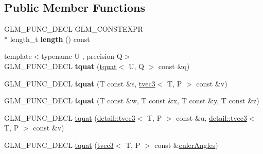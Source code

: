 \subsection*{Public Member Functions}
\begin{DoxyCompactItemize}
\item 
\hypertarget{structglm_1_1detail_1_1tquat_a430be0cf6fd0006c904b9ecdb03bd711}{G\-L\-M\-\_\-\-F\-U\-N\-C\-\_\-\-D\-E\-C\-L G\-L\-M\-\_\-\-C\-O\-N\-S\-T\-E\-X\-P\-R \\*
length\-\_\-t {\bfseries length} () const }\label{structglm_1_1detail_1_1tquat_a430be0cf6fd0006c904b9ecdb03bd711}

\item 
\hypertarget{structglm_1_1detail_1_1tquat_aa6b415284ed415db4ac328f3c0fd42d7}{{\footnotesize template$<$typename U , precision Q$>$ }\\G\-L\-M\-\_\-\-F\-U\-N\-C\-\_\-\-D\-E\-C\-L {\bfseries tquat} (\hyperlink{structglm_1_1detail_1_1tquat}{tquat}$<$ U, Q $>$ const \&q)}\label{structglm_1_1detail_1_1tquat_aa6b415284ed415db4ac328f3c0fd42d7}

\item 
\hypertarget{structglm_1_1detail_1_1tquat_aba298cc62aaee76c3d19294f33454187}{G\-L\-M\-\_\-\-F\-U\-N\-C\-\_\-\-D\-E\-C\-L {\bfseries tquat} (T const \&s, \hyperlink{structglm_1_1detail_1_1tvec3}{tvec3}$<$ T, P $>$ const \&v)}\label{structglm_1_1detail_1_1tquat_aba298cc62aaee76c3d19294f33454187}

\item 
\hypertarget{structglm_1_1detail_1_1tquat_af383bd6a9c92f94bc8b7ba0be770d4e5}{G\-L\-M\-\_\-\-F\-U\-N\-C\-\_\-\-D\-E\-C\-L {\bfseries tquat} (T const \&w, T const \&x, T const \&y, T const \&z)}\label{structglm_1_1detail_1_1tquat_af383bd6a9c92f94bc8b7ba0be770d4e5}

\item 
G\-L\-M\-\_\-\-F\-U\-N\-C\-\_\-\-D\-E\-C\-L \hyperlink{structglm_1_1detail_1_1tquat_a203189580d111eb8a73ed10a1d640464}{tquat} (\hyperlink{structglm_1_1detail_1_1tvec3}{detail\-::tvec3}$<$ T, P $>$ const \&u, \hyperlink{structglm_1_1detail_1_1tvec3}{detail\-::tvec3}$<$ T, P $>$ const \&v)
\item 
\hypertarget{structglm_1_1detail_1_1tquat_acfc1714febec517f5313a91c3ae2e687}{G\-L\-M\-\_\-\-F\-U\-N\-C\-\_\-\-D\-E\-C\-L \hyperlink{structglm_1_1detail_1_1tquat_acfc1714febec517f5313a91c3ae2e687}{tquat} (\hyperlink{structglm_1_1detail_1_1tvec3}{tvec3}$<$ T, P $>$ const \&\hyperlink{group__gtc__quaternion_gade4034f49ccadf63cb31a7fb5fa3c8aa}{euler\-Angles})}\label{structglm_1_1detail_1_1tquat_acfc1714febec517f5313a91c3ae2e687}


\end{DoxyCompactItemize}
